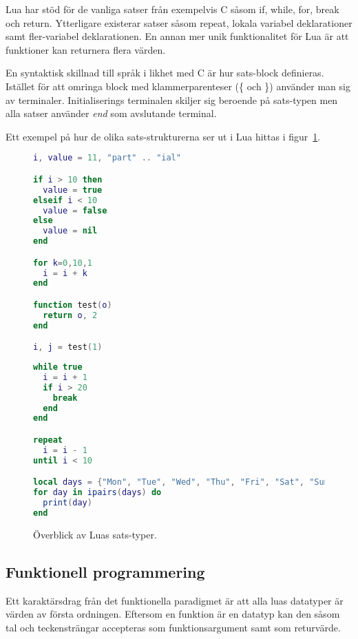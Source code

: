 Lua har stöd för de vanliga satser från exempelvis C såsom if, while, for,
break och return. Ytterligare existerar satser såsom repeat, lokala variabel
deklarationer samt fler-variabel deklarationen. En annan mer unik
funktionalitet för Lua är att funktioner kan returnera flera värden.

En syntaktisk skillnad till språk i likhet med C är hur sats-block definieras.
Istället för att omringa block med klammerparenteser (\{ och \}) använder man
sig av terminaler. Initialiserings terminalen skiljer sig beroende på
sats-typen men alla satser använder \textit{end} som avslutande terminal.

Ett exempel på hur de olika sats-strukturerna ser ut i Lua hittas i
figur~\ref{fig:luacode}.

\begin{figure}[ht]
  \begin{minipage}[t]{0.5\textwidth}
\begin{lstlisting}[language=Lua]
i, value = 11, "part" .. "ial"

if i > 10 then
  value = true
elseif i < 10
  value = false
else
  value = nil
end

for k=0,10,1
  i = i + k
end

function test(o)
  return o, 2
end

i, j = test(1)
\end{lstlisting}
  \end{minipage}
  \begin{minipage}[t]{0.5\textwidth}
\begin{lstlisting}[language=Lua]
while true
  i = i + 1
  if i > 20
    break
  end
end

repeat
  i = i - 1
until i < 10

local days = {"Mon", "Tue", "Wed", "Thu", "Fri", "Sat", "Sun"}
for day in ipairs(days) do
  print(day)
end
\end{lstlisting}
  \end{minipage}
  \caption{Överblick av Luas sats-typer.}
  \label{fig:luacode}
\end{figure}

\subsection{Funktionell programmering}

Ett karaktärsdrag från det funktionella paradigmet är att alla luas datatyper
är värden av första ordningen. Eftersom en funktion är en datatyp kan den såsom
tal och teckensträngar accepteras som funktionsargument samt som returvärde.

